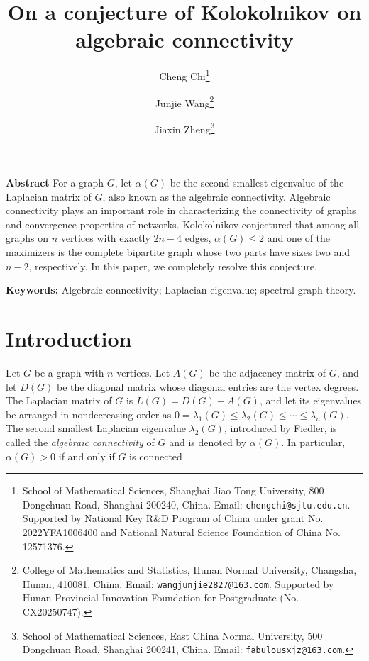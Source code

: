 \documentclass[11pt]{article}
\theoremstyle{definition}
\begin{document}
\title{\bf On a conjecture of Kolokolnikov on algebraic connectivity}
\author{
Cheng Chi\thanks{School of Mathematical Sciences, Shanghai Jiao Tong University, 800 Dongchuan Road, Shanghai 200240, China.
Email: {\tt chengchi@sjtu.edu.cn}. Supported by National Key R\&D Program of China under grant No. 2022YFA1006400 and National Natural Science Foundation of China No. 12571376.}
\and
Junjie Wang\thanks{College of Mathematics and Statistics, Hunan Normal University, Changsha,  Hunan, 410081, China.
Email: {\tt wangjunjie2827@163.com}. Supported by Hunan Provincial Innovation Foundation for Postgraduate (No. CX20250747).}
\and
Jiaxin Zheng\thanks{School of Mathematical Sciences, East China Normal University, 500 Dongchuan Road, Shanghai 200241, China.
Email: {\tt fabulousxjz@163.com}.}
}




\date{}
\maketitle
{\flushleft\large\bf Abstract } For a graph $G$, let $\alpha(G)$ be the second smallest eigenvalue of the Laplacian matrix of $G$, also known as the algebraic connectivity. Algebraic connectivity plays an important role in characterizing the connectivity of graphs and convergence properties of networks. Kolokolnikov conjectured that among all graphs on $n$ vertices with exactly $2n-4$ edges, $\alpha(G)\leq 2$ and one of the maximizers is the complete bipartite graph whose two parts have sizes two and $n-2$, respectively. In this paper, we completely resolve this conjecture.
\begin{flushleft}
  \textbf{Keywords:} Algebraic connectivity; Laplacian eigenvalue; spectral graph theory.
\end{flushleft}


\section{Introduction}

Let $G$ be a graph with $n$ vertices. Let $A(G)$ be the adjacency matrix of $G$, and let $D(G)$ be the diagonal matrix whose diagonal entries are the vertex degrees. The Laplacian matrix of $G$ is $L(G)=D(G)-A(G)$, and let its eigenvalues be arranged in nondecreasing order as $0=\lambda_1(G)\leq \lambda_2(G)\leq \cdots\leq \lambda_n(G)$. The second smallest Laplacian eigenvalue $\lambda_2(G)$, introduced by Fiedler, is called the \emph{algebraic connectivity} of $G$ and is denoted by $\alpha(G)$. In particular, $\alpha(G)>0$ if and only if $G$ is connected \cite{F73}.
\end{document}
